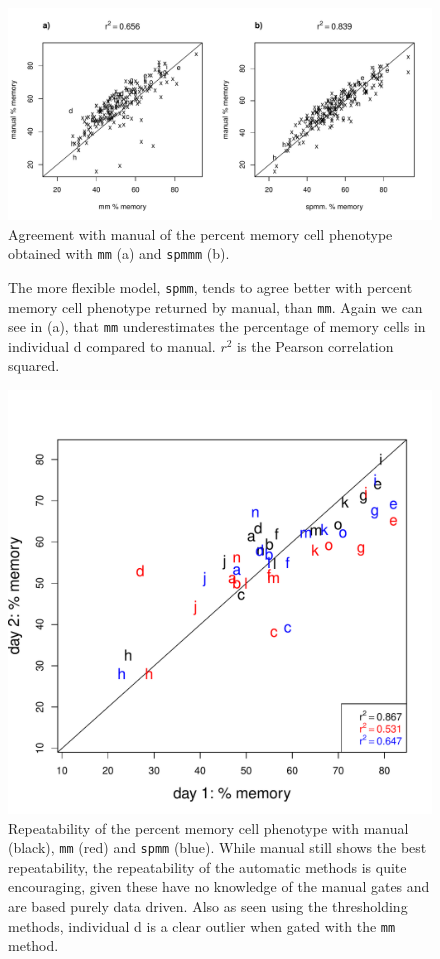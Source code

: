 \begin{figure}[h]
\centering
\includegraphics[scale=.5]{figures/memory-auto-manual-agreement-weights.pdf}
{Agreement with manual of the percent memory cell phenotype obtained with \texttt{mm} (a) and \texttt{spmmm} (b).}
{
  The more flexible model, \texttt{spmm}, tends to agree better with percent memory cell phenotype returned by manual, than \texttt{mm}.
  Again we can see in (a), that \texttt{mm} underestimates the percentage of memory cells in individual d compared to
  manual.  $r^2$ is the Pearson correlation squared.

}
\end{figure}


\begin{figure}[h]
\centering
  \includegraphics[width=.5\textwidth]{figures/repeatability-memory-weights.pdf}
{Repeatability of the percent memory cell phenotype with manual (black), \texttt{mm} (red) and \texttt{spmm} (blue).}
{
  While manual still shows the best repeatability, the repeatability of the automatic methods is quite encouraging, given
  these have no knowledge of the manual gates and are based purely data driven.
  Also as seen using the thresholding methods, individual d is a clear outlier when gated with the \texttt{mm} method.
}
\end{figure}


